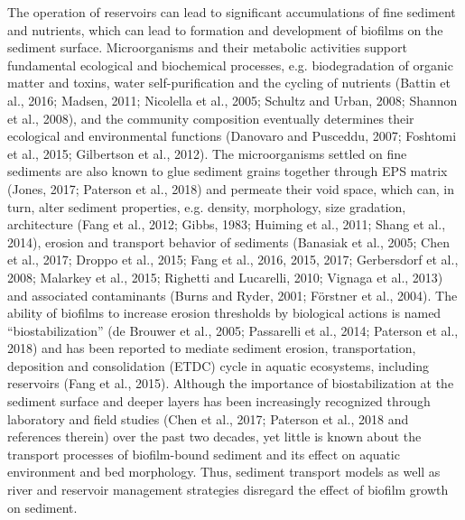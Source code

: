 The operation of reservoirs can lead to significant accumulations of fine sediment and nutrients, which can lead to formation and development of biofilms on the sediment surface. Microorganisms and their metabolic activities support fundamental ecological and biochemical processes, e.g. biodegradation of organic matter and toxins, water self-purification and the cycling of nutrients (Battin et al., 2016; Madsen, 2011; Nicolella et al., 2005; Schultz and Urban, 2008; Shannon et al., 2008), and the community composition eventually determines their ecological and environmental functions (Danovaro and Pusceddu, 2007; Foshtomi et al., 2015; Gilbertson et al., 2012). The microorganisms settled on fine sediments are also known to glue sediment grains together through EPS matrix (Jones, 2017; Paterson et al., 2018) and permeate their void space, which can, in turn, alter sediment properties, e.g. density, morphology, size gradation, architecture (Fang et al., 2012; Gibbs, 1983; Huiming et al., 2011; Shang et al., 2014), erosion and transport behavior of sediments (Banasiak et al., 2005; Chen et al., 2017; Droppo et al., 2015; Fang et al., 2016, 2015, 2017; Gerbersdorf et al., 2008; Malarkey et al., 2015; Righetti and Lucarelli, 2010; Vignaga et al., 2013) and associated contaminants (Burns and Ryder, 2001; Förstner et al., 2004). The ability of biofilms to increase erosion thresholds by biological actions is named “biostabilization” (de Brouwer et al., 2005; Passarelli et al., 2014; Paterson et al., 2018) and has been reported to mediate sediment erosion, transportation, deposition and consolidation (ETDC) cycle in aquatic ecosystems, including reservoirs (Fang et al., 2015). Although the importance of biostabilization at the sediment surface and deeper layers has been increasingly recognized through laboratory and field studies (Chen et al., 2017; Paterson et al., 2018 and references therein) over the past two decades, yet little is known about the transport processes of biofilm-bound sediment and its effect on aquatic environment and bed morphology. Thus, sediment transport models as well as river and reservoir management strategies disregard the effect of biofilm growth on sediment. 
